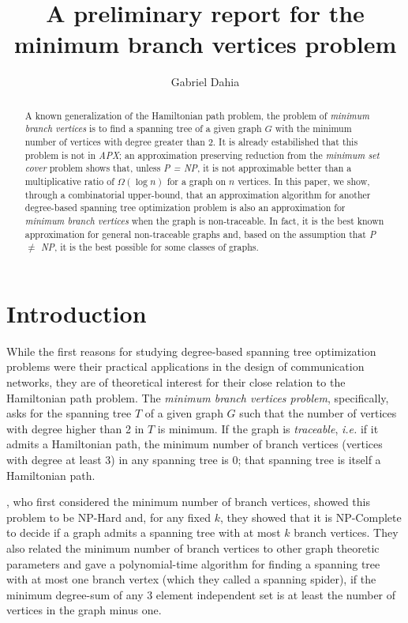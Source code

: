 \documentclass[12pt]{article}
\title{A preliminary report for the minimum branch vertices problem}
\author{Gabriel Dahia\inst{1}}
\begin{document}
 

\maketitle

\begin{abstract}
  A known generalization of the Hamiltonian path problem, the problem of \emph{minimum branch vertices} is to find a spanning tree of a given graph $G$ with the minimum number of vertices with degree greater than 2.
  It is already estabilished that this problem is not in \emph{APX}; an approximation preserving reduction from the \emph{minimum set cover} problem shows that, unless \emph{P = NP}, it is not approximable better than a multiplicative ratio of $\Omega(\log n )$ for a graph on $n$ vertices.
  In this paper, we show, through a combinatorial upper-bound, that an approximation algorithm for another degree-based spanning tree optimization problem is also an approximation for \emph{minimum branch vertices} when the graph is non-traceable.
  In fact, it is the best known approximation for general non-traceable graphs and, based on the assumption that \emph{P $\neq$ NP}, it is the best possible for some classes of graphs.
\end{abstract}
     
\section{Introduction}

While the first reasons for studying degree-based spanning tree optimization problems were their practical applications in the design of communication networks, they are of theoretical interest for their close relation to the Hamiltonian path problem.
The \emph{minimum branch vertices problem}, specifically, asks for the spanning tree $T$ of a given graph $G$ such that the number of vertices with degree higher than 2 in $T$ is minimum.
If the graph is \emph{traceable}, \emph{i.e.} if it admits a Hamiltonian path, the minimum number of branch vertices (vertices with degree at least 3) in any spanning tree is 0; that spanning tree is itself a Hamiltonian path.

\cite{gargano2002, gargano2004}, who first considered the minimum number of branch vertices, showed this problem to be NP-Hard and, for any fixed $k$, they showed that it is NP-Complete to decide if a graph admits a spanning tree with at most $k$ branch vertices. 
They also related the minimum number of branch vertices to other graph theoretic parameters and gave a polynomial-time algorithm for finding a spanning tree with at most one branch vertex (which they called a spanning spider), if the minimum degree-sum of any 3 element independent set is at least the number of vertices in the graph minus one.
\end{document}
